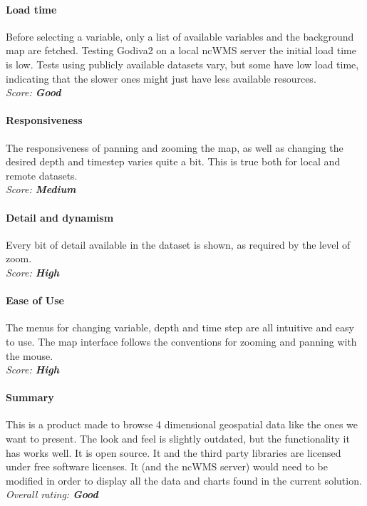\documentclass[11pt,a4paper,titlepage,oneside]{report}
\begin{document}
	\paragraph{Load time}
	Before selecting a variable, only a list of available variables and the background map are fetched. Testing Godiva2 on a local ncWMS server the initial load time is low. Tests using publicly available datasets vary, but some have low load time, indicating that the slower ones might just have less available resources.
   \\ \emph{Score: \textbf{Good}}
	
	\paragraph{Responsiveness}
	The responsiveness of panning and zooming the map, as well as changing the desired depth and timestep varies quite a bit. This is true both for local and remote datasets.
   \\ \emph{Score: \textbf{Medium}}
	
	\paragraph{Detail and dynamism}
	Every bit of detail available in the dataset is shown, as required by the level of zoom.
   \\ \emph{Score: \textbf{High}}
	
	\paragraph{Ease of Use}
	The menus for changing variable, depth and time step are all intuitive and easy to use. The map interface follows the conventions for zooming and panning with the mouse.
   \\ \emph{Score: \textbf{High}}
	
	\paragraph{Summary}
	This is a product made to browse 4 dimensional geospatial data like the ones we want to present. The look and feel is slightly outdated, but the functionality it has works well. It is \gls{open source}. It and the third party libraries are licensed under free software licenses. It (and the ncWMS server) would need to be modified in order to display all the data and charts found in the current solution.
   \\ \emph{Overall rating: \textbf{Good}}
	
\end{document}
